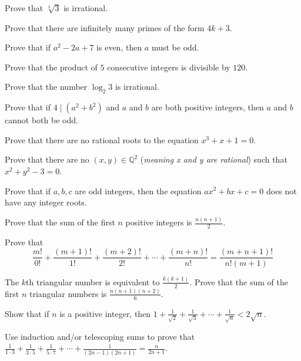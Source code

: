 \begin{prob}  Prove that $\sqrt[3]{3}$ is irrational.  \end{prob}
\begin{prob}  Prove that there are infinitely many primes of the form $4k+3$.  \end{prob}
\begin{prob}  Prove that if $a^2-2a+7$ is even, then $a$ must be odd.  \end{prob}
\begin{prob}  Prove that the product of $5$ consecutive integers is divisible by $120$.  \end{prob}
\begin{prob}  Prove that the number $\log_{2}3$ is irrational.  \end{prob}
\begin{prob}  Prove that if $4\mid (a^2+b^2)$ and $a$ and $b$ are both positive integers, then $a$ and $b$ cannot both be odd. \end{prob}  
\begin{prob}  Prove that there are no rational roots to the equation $x^3+x+1=0$.  \end{prob}  
\begin{prob}  Prove that there are no $(x,y)\in \mathbb{Q}^2$ (\textit{meaning x and y are rational}) such that $x^2+y^2-3=0$.  \end{prob}
\begin{prob}  Prove that if $a,b,c$ are odd integers, then the equation $ax^2+bx+c=0$ does not have any integer roots.  \end{prob}
\begin{prob}  Prove that the sum of the first $n$ positive integers is $\frac{n(n+1)}{2}$.  \end{prob}
\begin{prob}  Prove that $$\frac{m!}{0!}+\frac{(m+1)!}{1!}+\frac{(m+2)!}{2!}+\cdots+\frac{(m+n)!}{n!}=\frac{(m+n+1)!}{n!(m+1)}$$ \end{prob}  
\begin{prob}  The $k$th triangular number is equivalent to $\frac{k(k+1)}{2}$.  Prove that the sum of the first $n$ triangular numbers is $\frac{n(n+1)(n+2)}{6}$.  \end{prob}
\begin{prob}  Show that if $n$ is a positive integer, then $1+\frac{1}{\sqrt2}+\frac{1}{\sqrt3}+\cdots+\frac{1}{\sqrt{n}}<2\sqrt{n}$.  \end{prob}
\begin{prob}  Use induction and/or telescoping sums to prove that $\frac{1}{1\cdot 3}+\frac{1}{3\cdot 5}+\frac{1}{5\cdot 7}+\cdots +\frac{1}{(2n-1)(2n+1)}=\frac{n}{2n+1}$.  \end{prob}
